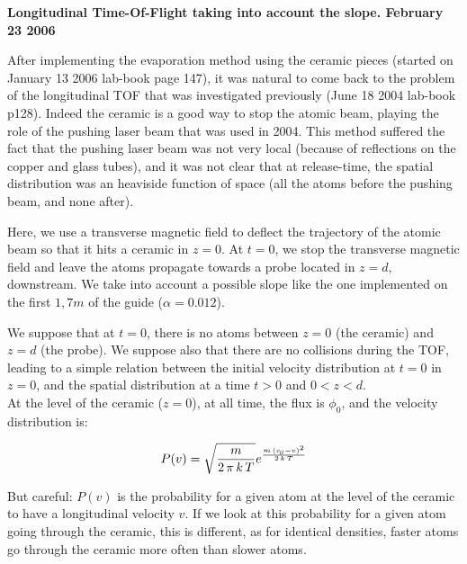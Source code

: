 \documentclass[a4,english,11pt]{article}
\begin{document}
\begin{center}
\begin{huge}
\textbf{Longitudinal Time-Of-Flight taking into account the slope.
February 23 2006}
\end{huge}
\end{center}

After implementing the evaporation method using the ceramic pieces
(started on January 13 2006 lab-book page 147), it was natural to
come back to the problem of the longitudinal TOF that was
investigated previously (June 18 2004 lab-book p128). Indeed the
ceramic is a good way to stop the atomic beam, playing the role of
the pushing laser beam that was used in 2004. This method suffered
the fact that the pushing laser beam was not very local (because of
reflections on the copper and glass tubes), and it was not clear
that at release-time, the spatial distribution was an heaviside
function of space (all the atoms before the pushing beam, and none
after).

Here, we use a transverse magnetic field to deflect the trajectory
of the atomic beam so that it hits a ceramic in $z=0$. At $t=0$, we
stop the transverse magnetic field and leave the atoms propagate
towards a probe located in $z=d$, downstream. We take into account a
possible slope like the one implemented on the first $1,7m$ of the
guide ($\alpha=0.012$).

We suppose that at $t=0$, there is no atoms between $z=0$ (the
ceramic) and $z=d$ (the probe). We suppose also that there are no
collisions during the TOF, leading to a simple relation between
the initial velocity distribution at $t=0$ in $z=0$, and the
spatial distribution at a time $t>0$ and $0<z<d$.\\

At the level of the ceramic ($z=0$), at all time, the flux is
$\phi_0$, and the velocity distribution is:

\begin{equation}\label{Velocity}
    P(v) = \sqrt {{\frac {m}{2\, \pi\, k\, T }}}{e^{{\frac {m\, \left( {\it v_0}-v \right) ^{2}}{2\,k\,T}}}}
\end{equation}

But careful: $P(v)$ is the probability for a given atom at the level
of the ceramic to have a longitudinal velocity $v$. If we look at
this probability for a given atom going through the ceramic, this is
different, as for identical densities, faster atoms go through the
ceramic more often than slower atoms.
\end{document}
